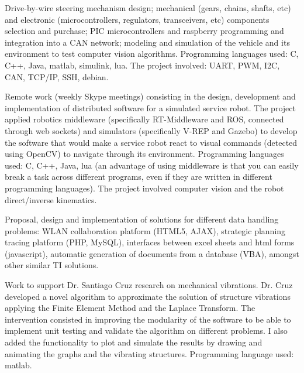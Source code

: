 \documentclass[helvetica,english,logo,notitle,totpages,utf8]{europecv2013}
\begin{document}
\begin{europecv}
{
Drive-by-wire steering mechanism design; mechanical (gears, chains, shafts, etc) and electronic (microcontrollers, regulators, transceivers, etc) components selection and purchase; PIC microcontrollers and raspberry programming and integration into a CAN network; modeling and simulation of the vehicle and its environment to test computer vision algorithms. Programming languages used: C, C++, Java, matlab, simulink, lua. The project involved: UART, PWM, I2C, CAN, TCP/IP, SSH, debian.
}

{
Remote work (weekly Skype meetings) consisting in the design, development and implementation of distributed software for a simulated service robot. The project applied robotics middleware (specifically RT-Middleware and ROS, connected through web sockets) and simulators (specifically V-REP and Gazebo) to develop the software that would make a service robot react to visual commands (detected using OpenCV) to navigate through its environment. Programming languages used: C, C++, Java, lua (an advantage of using middleware is that you can easily break a task across different programs, even if they are written in different programming languages). The project involved computer vision and the robot direct/inverse kinematics.
}

{
Proposal, design and implementation of solutions for different data handling problems: WLAN collaboration platform (HTML5, AJAX), strategic planning tracing platform (PHP, MySQL), interfaces between excel sheets and html forms (javascript), automatic generation of documents from a database (VBA), amongst other similar TI solutions.
}

{
Work to support Dr. Santiago Cruz research on mechanical vibrations. Dr. Cruz developed a novel algorithm to approximate the solution of structure vibrations applying the Finite Element Method and the Laplace Transform. The intervention consisted in improving the modularity of the software to be able to implement unit testing and validate the algorithm on different problems. I also added the functionality to plot and simulate the results by drawing and animating the graphs and the vibrating structures. Programming language used: matlab.
}


\end{europecv}
\end{document}
